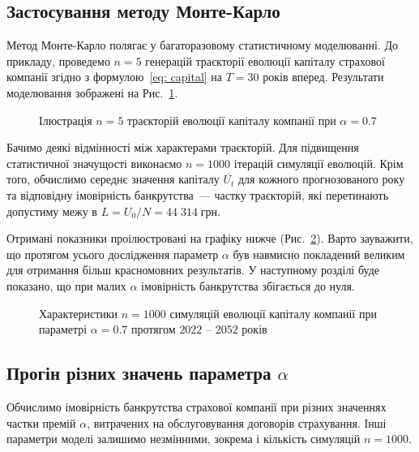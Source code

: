 \documentclass{mathreport}
\begin{document}
\subsection{Застосування методу Монте-Карло}

Метод Монте-Карло полягає у багаторазовому статистичному моделюванні. До прикладу, проведемо $n=5$ генерацій траєкторії еволюції капіталу страхової компанії згідно з формулою~\eqref{eq: capital} на $T=30$ років вперед. Результати моделювання зображені на Рис.~\ref{pic: monte carlo v=0.7}.

\begin{figure}[H]\centering
    
    \caption{Ілюстрація $n=5$ траєкторій еволюції капіталу компанії при $\alpha=0.7$}
    \label{pic: monte carlo v=0.7}
\end{figure}

Бачимо деякі відмінності між характерами траєкторій. Для підвищення статистичної значущості виконаємо $n=1000$ ітерацій симуляції еволюцій. Крім того, обчислимо середнє значення капіталу $\overline{U_t}$ для кожного прогнозованого року та відповідну імовірність банкрутства~--- частку траєкторій, які перетинають допустиму межу в $L=U_0/N=44\;314\;\text{грн}$. 

Отримані показники проілюстровані на графіку нижче (Рис.~\ref{pic: efficiency-risk v=0.7}). Варто зауважити, що протягом усього дослідження параметр $\alpha$ був навмисно покладений великим для отримання більш красномовних результатів. У наступному розділі буде показано, що при малих $\alpha$ імовірність банкрутства збігається до нуля.

\begin{figure}[H]\centering
    
    \caption{Характеристики $n=1000$ симуляцій еволюції капіталу компанії при параметрі $\alpha=0.7$ протягом $2022$ -- $2052$ років}
    \label{pic: efficiency-risk v=0.7}
\end{figure}

\subsection{Прогін різних значень параметра $\alpha$}

Обчислимо імовірність банкрутства страхової компанії при різних значеннях частки премій $\alpha$, витрачених на обслуговування договорів страхування. Інші параметри моделі залишимо незмінними, зокрема і кількість симуляцій $n=1000$.
\end{document}
